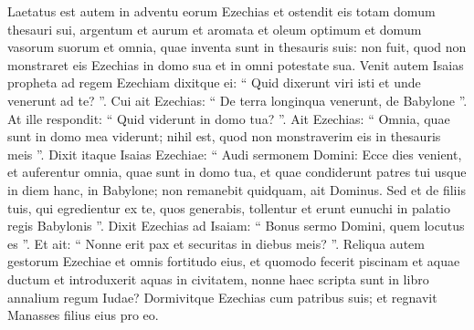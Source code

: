 \begin{biblechapter}
\begin{biblechapter}
\begin{biblechapter}
\begin{biblechapter}
\begin{biblechapter}
\begin{biblechapter}
\begin{biblechapter}
\begin{biblechapter}
\begin{biblechapter}
\begin{biblechapter}
\begin{biblechapter}
\begin{biblechapter}
\begin{biblechapter}
\begin{biblechapter}
\begin{biblechapter}
\begin{biblechapter}
\begin{biblechapter}
\begin{biblechapter}
\begin{biblechapter}
\begin{biblechapter}
\verse Laetatus est autem in adventu eorum Ezechias et ostendit eis totam domum thesauri sui, argentum et aurum et aromata et oleum optimum et domum vasorum suorum et omnia, quae inventa sunt in thesauris suis: non fuit, quod non monstraret eis Ezechias in domo sua et in omni potestate sua.
 \verse Venit autem Isaias propheta ad regem Ezechiam dixitque ei: “ Quid dixerunt viri isti et unde venerunt ad te? ”. Cui ait Ezechias: “ De terra longinqua venerunt, de Babylone ”. 
\verse At ille respondit: “ Quid viderunt in domo tua? ”. Ait Ezechias: “ Omnia, quae sunt in domo mea viderunt; nihil est, quod non monstraverim eis in thesauris meis ”.
 \verse Dixit itaque Isaias Ezechiae: “ Audi sermonem Domini: 
\verse Ecce dies venient, et auferentur omnia, quae sunt in domo tua, et quae condiderunt patres tui usque in diem hanc, in Babylone; non remanebit quidquam, ait Dominus. 
\verse Sed et de filiis tuis, qui egredientur ex te, quos generabis, tollentur et erunt eunuchi in palatio regis Babylonis ”. 
\verse Dixit Ezechias ad Isaiam: “ Bonus sermo Domini, quem locutus es ”. Et ait: “ Nonne erit pax et securitas in diebus meis? ”.
 \verse Reliqua autem gestorum Ezechiae et omnis fortitudo eius, et quomodo fecerit piscinam et aquae ductum et introduxerit aquas in civitatem, nonne haec scripta sunt in libro annalium regum Iudae? 
\verse Dormivitque Ezechias cum patribus suis; et regnavit Manasses filius eius pro eo.
 

\end{biblechapter}
\end{biblechapter}
\end{biblechapter}
\end{biblechapter}
\end{biblechapter}
\end{biblechapter}
\end{biblechapter}
\end{biblechapter}
\end{biblechapter}
\end{biblechapter}
\end{biblechapter}
\end{biblechapter}
\end{biblechapter}
\end{biblechapter}
\end{biblechapter}
\end{biblechapter}
\end{biblechapter}
\end{biblechapter}
\end{biblechapter}
\end{biblechapter}
